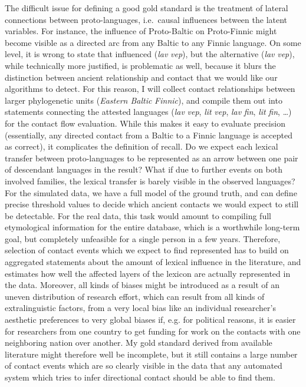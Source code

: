 The difficult issue for defining a good gold standard is the treatment of lateral connections between proto-languages, i.e.\ causal influences between the latent variables. For instance, the influence of Proto-Baltic on Proto-Finnic might become visible as a directed arc from any Baltic to any Finnic language. On some level, it is wrong to state that  influenced  (\textit{lav} \arrowLA \textit{vep}), but the alternative (\textit{lav} \arrowAA \textit{vep}), while technically more justified, is problematic as well, because it blurs the distinction between ancient relationship and contact that we would like our algorithms to detect. For this reason, I will collect contact relationships between larger phylogenetic units (\textit{Eastern Baltic} \arrowLA \textit{Finnic}), and compile them out into statements connecting the attested languages (\textit{lav} \arrowLA \textit{vep}, \textit{lit} \arrowLA \textit{vep}, \textit{lav} \arrowLA \textit{fin},
\textit{lit} \arrowLA \textit{fin}, \dots) for the contact flow evaluation. While this makes it easy to evaluate precision (essentially, any directed contact from a Baltic to a Finnic language is accepted as correct), it complicates the definition of recall. Do we expect each lexical transfer between proto-languages to be represented as an arrow between one pair of descendant languages in the result? What if due to further events on both involved families, the lexical transfer is barely visible in the observed languages? For the simulated data, we have a full model of the ground truth, and can define precise threshold values to decide which ancient contacts we would expect to still be detectable. For the real data, this task would amount to compiling full etymological information for the entire database, which is a worthwhile long-term goal, but completely unfeasible for a single person in a few years. Therefore, selection of contact events which we expect to find represented has to build on aggregated
statements about the amount of lexical influence in the literature, and estimates how well the affected layers of the lexicon are actually represented in the data. Moreover, all kinds of biases might be introduced as a result of an uneven distribution of research effort, which can result from all kinds of extralinguistic factors, from a very local bias like an individual researcher's aesthetic preferences to very global biases if, e.g. for political reasons, it is easier for researchers from one country to get funding for work on the contacts with one neighboring nation over another. My gold standard derived from available literature might therefore well be incomplete, but it still contains a large number of contact events which are so clearly visible in the data that any automated system which tries to infer directional contact should be able to find them.

